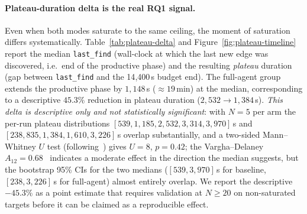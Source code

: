 \documentclass[11pt]{article}
\begin{document}
\paragraph{Plateau-duration delta is the real RQ1 signal.}
Even when both modes saturate to the same ceiling, the moment of
saturation differs systematically. Table~\ref{tab:plateau-delta}
and Figure~\ref{fig:plateau-timeline} report the median
\texttt{last\_find} (wall-clock at which the last new edge was
discovered, i.e.~end of the productive phase) and the resulting
\emph{plateau} duration (gap between \texttt{last\_find} and the
14{,}400\,s budget end). The full-agent group extends the
productive phase by $1{,}148$\,s ($\approx 19$\,min) at the
median, corresponding to a descriptive $45.3\%$ reduction in
plateau duration ($2{,}532 \to 1{,}384$\,s). \emph{This delta is
descriptive only and not statistically significant}: with $N{=}5$
per arm the per-run plateau distributions $[539, 1{,}185, 2{,}532,
3{,}314, 3{,}970]$\,s and $[238, 835, 1{,}384, 1{,}610, 3{,}226]$\,s
overlap substantially, and a two-sided Mann--Whitney $U$ test
(following~\cite{klees2018evaluating,arcuri2011practical}) gives
$U{=}8$, $p{=}0.42$; the Vargha--Delaney
$A_{12}{=}0.68$~\cite{vargha2000critique} indicates a moderate
effect in the direction the median suggests, but the bootstrap
95\% CIs for the two medians ($[539, 3{,}970]$\,s for baseline,
$[238, 3{,}226]$\,s for full-agent) almost entirely overlap. We
report the descriptive $-45.3\%$ as a point estimate that requires
validation at $N{\geq}20$ on non-saturated targets before it can be
claimed as a reproducible effect.
\end{document}
